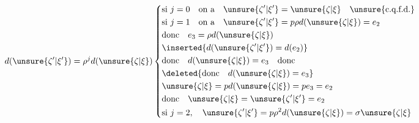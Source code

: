 \[
d(\unsure{\zeta'|\xi'})=\rho^j d(\unsure{\zeta|\xi})
\left\{\begin{aligned}
&\text{si }j=0\quad\text{on a}\quad\unsure{\zeta'|\xi'}=\unsure{\zeta|\xi}\quad\unsure{\text{c.q.f.d.}}\\
&\text{si }j=1\quad\text{on a}\quad\unsure{\zeta'|\xi'}=p\rho d(\unsure{\zeta|\xi})=e_2\\
&\text{donc}\quad e_3=\rho d(\unsure{\zeta|\xi})\\
&\inserted{d(\unsure{\zeta'|\xi'})=d(e_2)}\\
&\text{donc}\quad d(\unsure{\zeta|\xi})=e_3\quad\text{donc}\\
&\deleted{\text{donc}\quad d(\unsure{\zeta|\xi})=e_3}\\
&\unsure{\zeta|\xi}=pd(\unsure{\zeta|\xi})=pe_3=e_2\\
&\text{donc}\quad\unsure{\zeta|\xi}=\unsure{\zeta'|\xi'}=e_2\\
&\text{si }j=2,\quad\unsure{\zeta'|\xi'}=p\rho^2d(\unsure{\zeta|\xi})=\sigma\unsure{\zeta|\xi}
\end{aligned}\right.
\]

